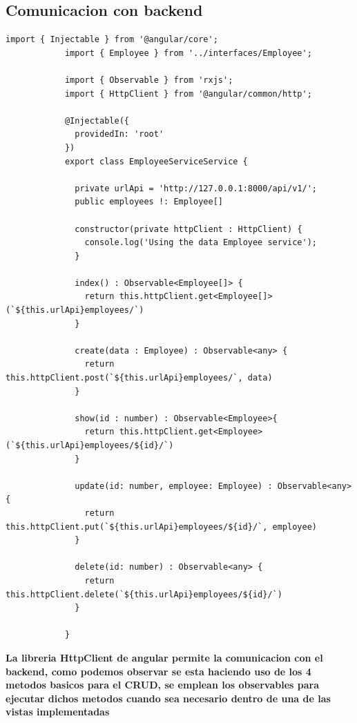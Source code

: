 \documentclass{article}
\begin{document}
    \subsection{Comunicacion con backend}
            \begin{lstlisting}[caption=Servicio EmployeeService]
            import { Injectable } from '@angular/core';
            import { Employee } from '../interfaces/Employee';
            
            import { Observable } from 'rxjs';
            import { HttpClient } from '@angular/common/http';
            
            @Injectable({
              providedIn: 'root'
            })
            export class EmployeeServiceService {
            
              private urlApi = 'http://127.0.0.1:8000/api/v1/';
              public employees !: Employee[]
            
              constructor(private httpClient : HttpClient) {
                console.log('Using the data Employee service');
              }
            
              index() : Observable<Employee[]> {
                return this.httpClient.get<Employee[]>(`${this.urlApi}employees/`)
              }
            
              create(data : Employee) : Observable<any> {
                return this.httpClient.post(`${this.urlApi}employees/`, data)
              }
            
              show(id : number) : Observable<Employee>{
                return this.httpClient.get<Employee>(`${this.urlApi}employees/${id}/`)
              }
            
              update(id: number, employee: Employee) : Observable<any> {
                return this.httpClient.put(`${this.urlApi}employees/${id}/`, employee)
              }
            
              delete(id: number) : Observable<any> {
                return this.httpClient.delete(`${this.urlApi}employees/${id}/`)
              }
            
            }
            \end{lstlisting}
        \textbf{La libreria HttpClient de angular permite la comunicacion con el backend, como podemos observar se esta haciendo uso de los 4 metodos basicos para el CRUD, se emplean los observables para ejecutar dichos metodos cuando sea necesario dentro de una de las vistas implementadas}
    
\end{document}
